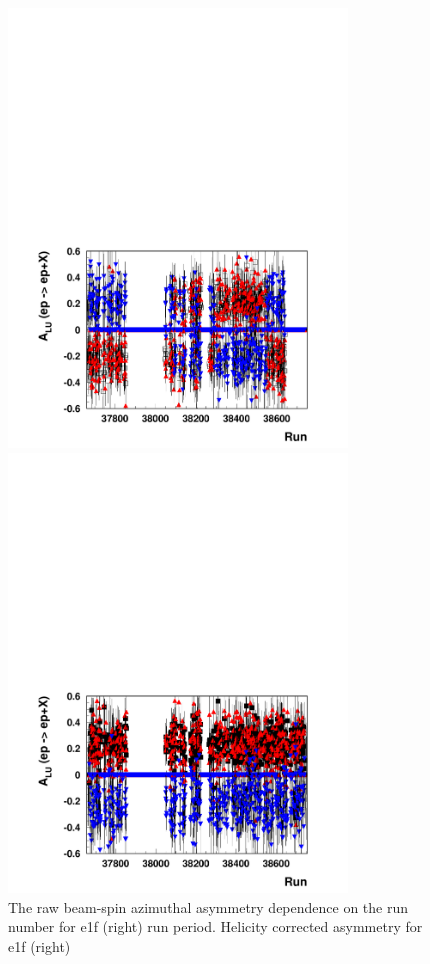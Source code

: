 \documentclass[11pt,a4paper]{article}
\begin{document}
\begin{figure}[hptb]
\begin{minipage}{.6\textwidth}
\includegraphics[width=9cm]{plots/dvcsalue1f-r37660-38750.pdf}
\end{minipage}
\begin{minipage}{.6\textwidth}
\includegraphics[width=9cm]{plots/dvcsalupass2nt21c-e1f.pdf}
\end{minipage}
   \caption{ The raw beam-spin azimuthal asymmetry  dependence on the run number
for e1f (right) run period. Helicity corrected asymmetry for e1f (right)}
 \label{fig:dvcsalupass2nt21c.e1f}
\end{figure}
\end{document}
